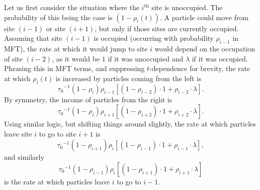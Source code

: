 Let us first consider the situation where the $i^\mathrm{th}$ site is unoccupied. The probability of this being the case is $(1-\rho_i (t))$. A particle could move from site $(i-1)$ or site $(i+1)$, but only if those sites are currently occupied.
Assuming that site $(i-1)$ is occupied (occurring with probability $\rho_{i-1}$ in MFT), the rate at which it would jump to site $i$ would depend on the occupation of site $(i-2)$,
as it would be $1$ if it was unoccupied and $\lambda$ if it was occupied. Phrasing this in MFT terms,
and suppressing $t$-dependence for brevity, the rate at which $\rho_i (t)$ is increased by particles coming from the left is
\begin{equation}
{\tau_0}^{-1} \left(1-\rho_i \right) \rho_{i-1} \left[ \left(1-\rho_{i-2} \right) \cdot 1  +   \rho_{i-2} \cdot \lambda \right].
\end{equation}
By symmetry, the income of particles from the right is
\begin{equation}
{\tau_0}^{-1} \left(1-\rho_i \right) \rho_{i+1} \left[ \left(1-\rho_{i+2} \right) \cdot 1  +   \rho_{i+2} \cdot \lambda \right].
\end{equation}
Using similar logic, but shifting things around slightly, the rate at which particles leave site $i$ to go to site $i+1$ is
\begin{equation}
{\tau_0}^{-1} \left(1-\rho_{i+1} \right) \rho_{i} \left[ \left(1-\rho_{i-1} \right) \cdot 1  +   \rho_{i-1} \cdot \lambda \right],
\end{equation}
and similarly 
\begin{equation}
{\tau_0}^{-1} \left(1-\rho_{i-1} \right) \rho_{i} \left[ \left(1-\rho_{i+1} \right) \cdot 1  +   \rho_{i+1} \cdot \lambda \right]
\end{equation}
is the rate at which particles leave $i$ to go to $i-1$.

